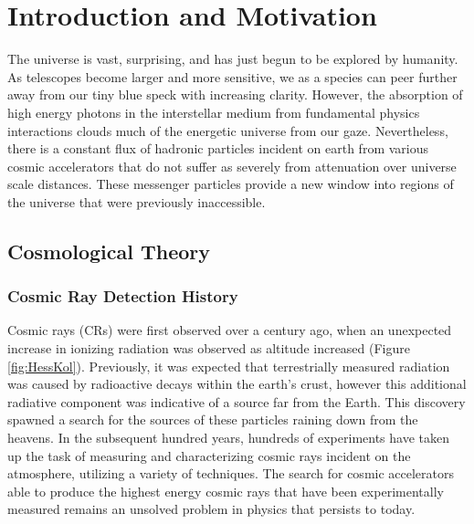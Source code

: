 



\chapter{Introduction and Motivation}
		The universe is vast, surprising, and has just begun to be explored by humanity.  As telescopes become larger and more sensitive, we as a species can peer further away from our tiny blue speck with increasing clarity.  However, the absorption of high energy photons in the interstellar medium from fundamental physics interactions clouds much of the energetic universe from our gaze.  Nevertheless, there is a constant flux of hadronic particles incident on earth from various cosmic accelerators that do not suffer as severely from attenuation over universe scale distances.  These messenger particles provide a new window into regions of the universe that were previously inaccessible.
\section{Cosmological Theory}
	\subsection{Cosmic Ray Detection History}
	Cosmic rays (CRs) were first observed over a century ago, when an unexpected increase in ionizing radiation was observed as altitude increased (Figure \ref{fig:HessKol}).  Previously, it was expected that terrestrially measured radiation was caused by radioactive decays within the earth's crust, however this additional radiative component was indicative of a source far from the Earth.\cite{HessCosmicRay}  This discovery spawned a search for the sources of these particles raining down from the heavens.  In the subsequent hundred years, hundreds of experiments have taken up the task of measuring and characterizing cosmic rays incident on the atmosphere, utilizing a variety of techniques.\cite{Olive:2016xmw}  The search for cosmic accelerators able to produce the highest energy cosmic rays that have been experimentally measured remains an unsolved problem in physics that persists to today. 
	
